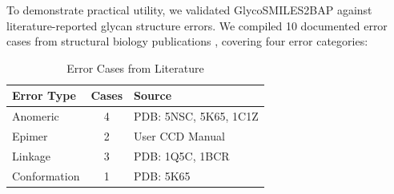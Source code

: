 To demonstrate practical utility, we validated GlycoSMILES2BAP against literature-reported glycan structure errors. We compiled 10 documented error cases from structural biology publications \citep{frenz2018, jo2011}, covering four error categories:

\begin{table}[h]
\centering
\caption{Error Cases from Literature}
\label{tab:errors}
\begin{tabular}{lcl}
\toprule
\textbf{Error Type} & \textbf{Cases} & \textbf{Source} \\
\midrule
Anomeric & 4 & PDB: 5NSC, 5K65, 1C1Z \\
Epimer & 2 & User CCD Manual \\
Linkage & 3 & PDB: 1Q5C, 1BCR \\
Conformation & 1 & PDB: 5K65 \\
\bottomrule
\end{tabular}
\end{table}

